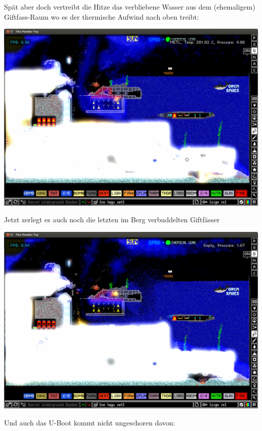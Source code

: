 \documentclass[10pt,a4paper,ngerman,twoside]{article} %
\begin{document}
\begin{multicols}{2}
\begin{center}
\end{center}
Spät aber doch vertreibt die Hitze das verbliebene Wasser aus dem (ehemaligem) Giftfass-Raum wo es der thermische Aufwind nach oben treibt:
\begin{center}
\includegraphics[width=\linewidth]{powdertoy/powdertoy-bu10.png}
\end{center}
Jetzt zerlegt es auch noch die letzten im Berg verbuddelten Giftfässer
\begin{center}
\includegraphics[width=\linewidth]{powdertoy/powdertoy-bu12.png}
\end{center}
Und auch das U-Boot kommt nicht ungeschoren davon:
\begin{center}

\end{center}
\end{multicols}
\end{document}
